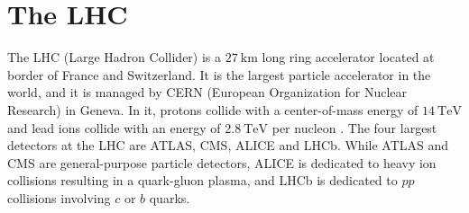 \section{The LHC}

The LHC (Large Hadron Collider) is a $\qty{27}{\km}$ long ring accelerator located at border of France and Switzerland. 
It is the largest particle accelerator in the world, and it is managed by CERN (European Organization for Nuclear Research) in Geneva.
In it, protons collide with a center-of-mass energy of $\qty{14}{\TeV}$ and lead ions collide with an energy of $\qty{2.8}{\TeV}$ per nucleon \cite{LHC}.
The four largest detectors at the LHC are ATLAS\cite{ATLAS}, CMS\cite{CMS}, ALICE\cite{ALICE} and LHCb\cite{LHCb}.
While ATLAS and CMS are general-purpose particle detectors, ALICE is dedicated to heavy ion collisions resulting in a quark-gluon plasma, and LHCb is dedicated to $pp$ collisions involving $c$ or $b$ quarks.
